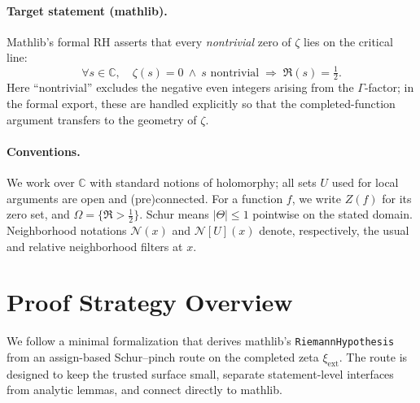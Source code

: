 \documentclass[11pt]{article}
\theoremstyle{plain}
\theoremstyle{definition}
\begin{document}
\paragraph{Target statement (mathlib).}
Mathlib's formal RH asserts that every \emph{nontrivial} zero of \(\zeta\) lies on the critical line:
\[
  \forall s\in\mathbb{C},\quad \zeta(s)=0 \ \wedge\ s \text{ nontrivial} \;\Longrightarrow\; \Re(s)=\tfrac12.
\]
Here ``nontrivial'' excludes the negative even integers arising from the \(\Gamma\)-factor; in the formal export, these are handled explicitly so that the completed-function argument transfers to the geometry of \(\zeta\).

\paragraph{Conventions.}
We work over \(\mathbb{C}\) with standard notions of holomorphy; all sets \(U\) used for local arguments are open and (pre)connected. For a function \(f\), we write \(Z(f)\) for its zero set, and \(\Omega=\{ \Re>\tfrac12 \}\). Schur means \(|\Theta|\le 1\) pointwise on the stated domain. Neighborhood notations \(\mathcal{N}(x)\) and \(\mathcal{N}[U](x)\) denote, respectively, the usual and relative neighborhood filters at \(x\).

\section{Proof Strategy Overview}
\label{sec:strategy}

We follow a minimal formalization that derives mathlib's \texttt{RiemannHypothesis} from an assign-based Schur--pinch route on the completed zeta \(\xi_{\mathrm{ext}}\). The route is designed to keep the trusted surface small, separate statement-level interfaces from analytic lemmas, and connect directly to mathlib.
\end{document}
